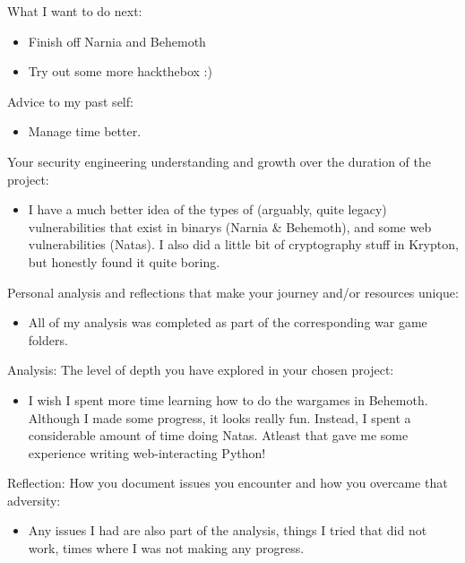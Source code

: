 \documentclass{article}
\begin{document}
What I want to do next:

\begin{itemize}
	\item Finish off Narnia and Behemoth
	\item Try out some more hackthebox :)
\end{itemize}

Advice to my past self:
	
\begin{itemize}
	\item Manage time better.
\end{itemize}

Your security engineering understanding and growth over the duration of the project:

\begin{itemize}
	\item I have a much better idea of the types of (arguably, quite legacy) vulnerabilities that exist in binarys (Narnia \& Behemoth), and some web vulnerabilities (Natas). I also did a little bit of cryptography stuff in Krypton, but honestly found it quite boring.
\end{itemize}

Personal analysis and reflections that make your journey and/or resources unique:

\begin{itemize}
	\item All of my analysis was completed as part of the corresponding war game folders.
\end{itemize}

Analysis: The level of depth you have explored in your chosen project:

\begin{itemize}
	\item I wish I spent more time learning how to do the wargames in Behemoth. Although I made some progress, it looks really fun. Instead, I spent a considerable amount of time doing Natas. Atleast that gave me some experience writing web-interacting Python!
\end{itemize}

Reflection: How you document issues you encounter and how you overcame that adversity:

\begin{itemize}
	\item Any issues I had are also part of the analysis, things I tried that did not work, times where I was not making any progress.
\end{itemize}
\end{document}
